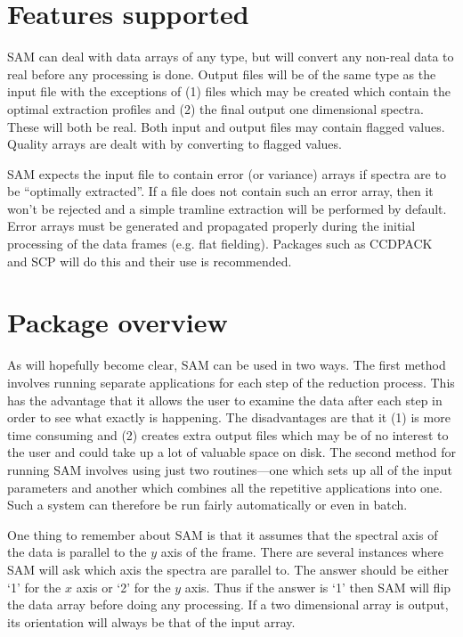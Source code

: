 \section{Features supported}

SAM can deal with data arrays of any type, but will convert any non-real data
to real before any processing is done.  Output files will be of the same type
as the input file with the exceptions of (1) files which may be created which
contain the optimal extraction profiles and (2) the final output one
dimensional spectra.  These will both be real.  Both input and output files
may contain flagged values.  Quality arrays are dealt with by converting to
flagged values.

SAM expects the input file to contain error (or variance) arrays if spectra
are to be ``optimally extracted''.  If a file does not contain such an error
array, then it won't be rejected and a simple tramline extraction will be
performed by default.  Error arrays must be generated and propagated properly
during the initial processing of the data frames (e.g. flat fielding).
Packages such as CCDPACK and SCP will do this and their use is recommended.

\section{Package overview}

As will hopefully become clear, SAM can be used in two ways.  The first method
involves running separate applications for each step of the reduction process.
This has the advantage that it allows the user to examine the data after each
step in order to see what exactly is happening.  The disadvantages are that it
(1) is more time consuming and (2) creates extra output files which may be of
no interest to the user and could take up a lot of valuable space on disk.
The second method for running SAM involves using just two routines---one
which  sets up all of the input parameters and another which combines all the
repetitive applications into one. Such a system can therefore be run fairly
automatically or even in batch.

One thing to remember about SAM is that it assumes that the spectral axis of
the data is parallel to the $y$ axis of the frame.  There are several
instances where SAM will ask which axis the spectra are parallel to.  The
answer should be either `1' for the $x$ axis or `2' for the $y$ axis.  Thus if
the answer is `1' then SAM will flip the data array before doing any
processing.  If a two dimensional array is output, its orientation will always
be that of the input array.


